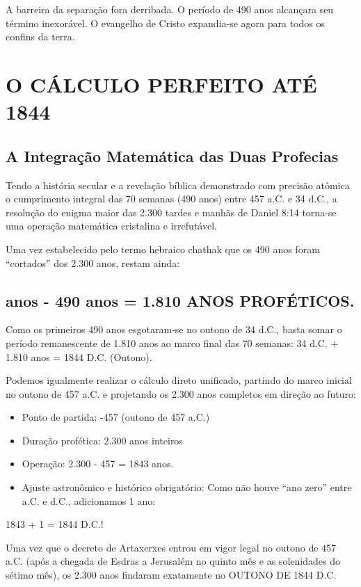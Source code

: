 \documentclass[11pt,a4paper,openany]{book}
\begin{document}
A barreira da separação fora derribada. O período de 490 anos alcançara seu término inexorável. O evangelho de Cristo expandia-se agora para todos os confins da terra.



\section{O CÁLCULO PERFEITO ATÉ 1844}



\subsection{A Integração Matemática das Duas Profecias}


Tendo a história secular e a revelação bíblica demonstrado com precisão atômica o cumprimento integral das 70 semanas (490 anos) entre 457 a.C. e 34 d.C., a resolução do enigma maior das 2.300 tardes e manhãs de Daniel 8:14 torna-se uma operação matemática cristalina e irrefutável.

Uma vez estabelecido pelo termo hebraico chathak que os 490 anos foram ``cortados'' dos 2.300 anos, restam ainda:

\subsection{anos - 490 anos = 1.810 ANOS PROFÉTICOS.}


Como os primeiros 490 anos esgotaram-se no outono de 34 d.C., basta somar o período remanescente de 1.810 anos ao marco final das 70 semanas:
34 d.C. + 1.810 anos = 1844 D.C. (Outono).

Podemos igualmente realizar o cálculo direto unificado, partindo do marco inicial no outono de 457 a.C. e projetando os 2.300 anos completos em direção ao futuro:
\begin{itemize}
  \item Ponto de partida: -457 (outono de 457 a.C.)
  \item Duração profética: 2.300 anos inteiros
  \item Operação: 2.300 - 457 = 1843 anos.
  \item Ajuste astronômico e histórico obrigatório: Como não houve ``ano zero'' entre a.C. e d.C., adicionamos 1 ano:
\end{itemize}

1843 + 1 = 1844 D.C.!

Uma vez que o decreto de Artaxerxes entrou em vigor legal no outono de 457 a.C. (após a chegada de Esdras a Jerusalém no quinto mês e as solenidades do sétimo mês), os 2.300 anos findaram exatamente no OUTONO DE 1844 D.C.
\end{document}

